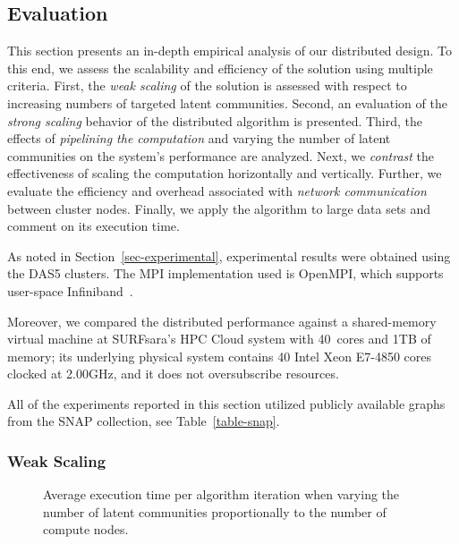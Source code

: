 \subsection{Evaluation}

This section presents an in-depth empirical analysis of our distributed design.
To this end, we assess the scalability and
efficiency of the solution using multiple criteria.
%
First, the \textit{weak scaling} of the solution is assessed with respect to increasing
numbers of targeted latent communities.
%
Second, an evaluation of the \textit{strong scaling} behavior of the distributed
algorithm is presented.
%
Third, the effects of \textit{pipelining the computation} and varying the number of latent communities on the system's
performance are analyzed.
%
Next, we \textit{contrast} the effectiveness of scaling the computation horizontally
and vertically.
%
Further, we evaluate the efficiency and overhead associated with \textit{network
communication} between cluster nodes.
%
Finally, we apply the algorithm to large data sets and comment on its execution time.

As noted in Section~\ref{sec-experimental}, experimental results
were obtained using the DAS5 clusters.
The MPI implementation used is OpenMPI, which supports
user-space Infiniband~\cite{gabriel04:_open_mpi}.

Moreover, we compared the distributed performance against a shared-memory virtual machine
at SURFsara's HPC Cloud system with 40~cores and 1TB of memory; its underlying
physical system contains 40 Intel Xeon E7-4850 cores clocked at 2.00GHz, and
it does not oversubscribe resources.

All of the experiments reported in this section utilized
publicly available graphs from the SNAP collection, see Table~\ref{table-snap}.

\subsubsection{Weak Scaling}

\begin{figure}[tb] %
  \centering
  \caption{Average execution time per algorithm iteration when varying
  the number of latent communities proportionally to the number of compute
  nodes.}
  \label{fig-weak-scaling}
\end{figure}

